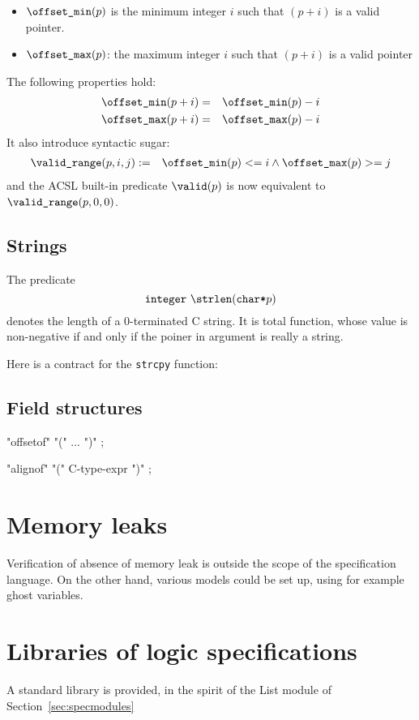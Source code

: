 \begin{itemize}
\item $\texttt{{\textbackslash}offset\_min}(p)$ is the minimum integer $i$ such that $(p+i)$ is a
  valid pointer.

\item $\texttt{{\textbackslash}offset\_max}(p)$: the maximum integer $i$ such that $(p+i)$ is a
  valid pointer
\end{itemize}
The following properties hold:
\begin{eqnarray*}
\texttt{{\textbackslash}offset\_min}(p+i) &=& \texttt{{\textbackslash}offset\_min}(p)-i \\
\texttt{{\textbackslash}offset\_max}(p+i) &=& \texttt{{\textbackslash}offset\_max}(p)-i
\end{eqnarray*}
It also introduce syntactic sugar:
\begin{eqnarray*}
\texttt{{\textbackslash}valid\_range}(p,i,j) &:=& \texttt{{\textbackslash}offset\_min}(p) <= i \land \texttt{{\textbackslash}offset\_max}(p) >= j 
\end{eqnarray*}
and the ACSL built-in predicate $\texttt{{\textbackslash}valid}(p)$ is now equivalent to
$\texttt{{\textbackslash}valid\_range}(p,0,0)$.

\subsection{Strings}

\experimental

The predicate 
\[
\integer~\strlen(\verb|char*|p)
\]
denotes the length of a 0-terminated C string. It is total function,
whose value is non-negative if and only if the poiner in argument is
really a string.

\begin{example}
  Here is a contract for the \verb|strcpy| function:
  

\end{example}

\subsection{Field structures}

 "offsetof" "(" ... ")" ; \experimental

 "alignof" "(" C-type-expr ")" ; \experimental

\section{Memory leaks}

\experimental

Verification of absence of memory leak is outside the scope of the
specification language. On the other hand, various models could be set
up, using for example ghost variables.

\section{Libraries of logic specifications}
\label{sec:speclibraries}

A standard library is provided, in the spirit of the List module of
Section~\ref{sec:specmodules}

